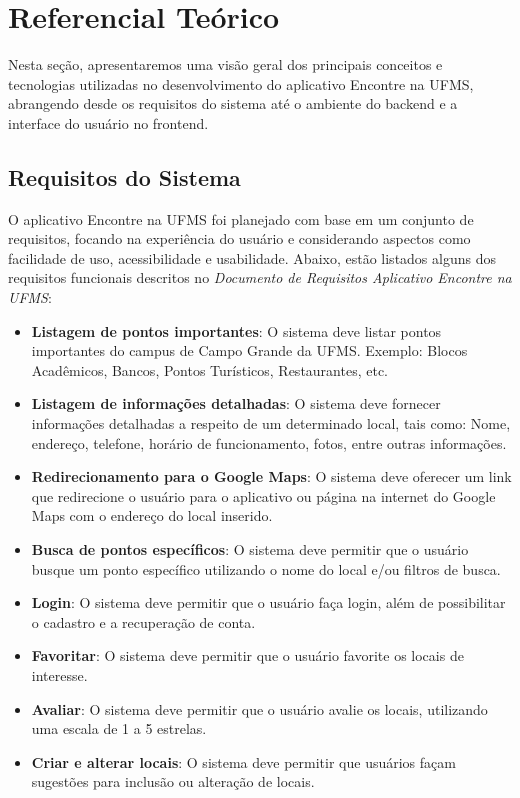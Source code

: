 \section{Referencial Teórico}

Nesta seção, apresentaremos uma visão geral dos principais conceitos e tecnologias utilizadas no desenvolvimento do aplicativo Encontre na UFMS, abrangendo desde os requisitos do sistema até o ambiente do backend e a interface do usuário no frontend.

\subsection{Requisitos do Sistema}

O aplicativo Encontre na UFMS foi planejado com base em um conjunto de requisitos, focando na experiência do usuário e considerando aspectos como facilidade de uso, acessibilidade e usabilidade. Abaixo, estão listados alguns dos requisitos funcionais descritos no \textit{Documento de Requisitos Aplicativo Encontre na UFMS}\cite{documentoRequisitosAplicativoEncontreNaUFMS}:

\begin{itemize}
  \item \textbf{Listagem de pontos importantes}: O sistema deve listar pontos importantes do campus de Campo Grande da UFMS. Exemplo: Blocos Acadêmicos, Bancos, Pontos Turísticos, Restaurantes, etc.
  \item \textbf{Listagem de informações detalhadas}: O sistema deve fornecer informações detalhadas a respeito de um determinado local, tais como: Nome, endereço, telefone, horário de funcionamento, fotos, entre outras informações.
  \item \textbf{Redirecionamento para o Google Maps}:  O sistema deve oferecer um link que redirecione o usuário para o aplicativo ou página na internet do Google Maps \cite{maps2005} com o endereço do local inserido.
  \item \textbf{Busca de pontos específicos}: O sistema deve permitir que o usuário busque um ponto específico utilizando o nome do local e/ou filtros de busca.
  \item \textbf{Login}: O sistema deve permitir que o usuário faça login, além de possibilitar o cadastro e a recuperação de conta.
  \item \textbf{Favoritar}:  O sistema deve permitir que o usuário favorite os locais de interesse.
  \item \textbf{Avaliar}:  O sistema deve permitir que o usuário avalie os locais, utilizando uma escala de 1 a 5 estrelas.
  \item \textbf{Criar e alterar locais}: O sistema deve permitir que usuários façam sugestões para inclusão ou alteração de locais.
\end{itemize}

